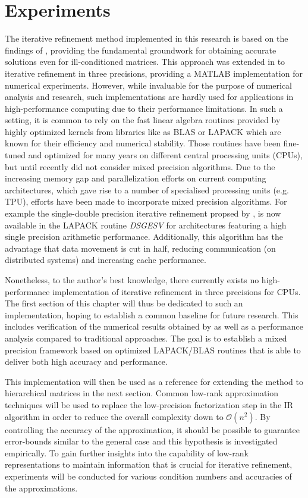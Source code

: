 \chapter{Experiments}
\label{chap:experiments}

The iterative refinement method implemented in this research is based on the findings of \cite{carson_new_2017}, providing the fundamental groundwork for obtaining accurate solutions even for ill-conditioned matrices. This approach was extended in \cite{carson_accelerating_2018} to iterative refinement in three precisions, providing a MATLAB implementation for numerical experiments. However, while invaluable for the purpose of numerical analysis and research, such implementations are hardly used for applications in high-performance computing due to their performance limitations. In such a setting, it is common to rely on the fast linear algebra routines provided by highly optimized kernels from libraries like as BLAS or LAPACK which are known for their efficiency and numerical stability. Those routines have been fine-tuned and optimized for many years on different central processing units (CPUs), but until recently did not consider mixed precision algorithms. Due to the increasing memory gap and parallelization efforts on current computing architectures, which gave rise to a number of specialised processing units (e.g. TPU), efforts have been made to incorporate mixed precision algorithms. For example the single-double precision iterative refinement propsed by \cite{langou_exploiting_2006}, is now available in the LAPACK routine \textit{DSGESV} for architectures featuring a high single precision arithmetic performance. Additionally, this algorithm has the advantage that data movement is cut in half, reducing communication (on distributed systems) and increasing cache performance. 

Nonetheless, to the author's best knowledge, there currently exists no high-performance implementation of iterative refinement in three precisions for CPUs. The first section of this chapter will thus be dedicated to such an implementation, hoping to establish a common baseline for future research. This includes verification of the numerical results obtained by \cite{carson_accelerating_2018} as well as a performance analysis compared to traditional approaches. The goal is to establish a mixed precision framework based on optimized LAPACK/BLAS routines that is able to deliver both high accuracy and performance.

This implementation will then be used as a reference for extending the method to hierarchical matrices in the next section. Common low-rank approximation techniques will be used to replace the low-precision factorization step in the IR algorithm in order to reduce the overall complexity down to $\mathcal{O}(n^2)$. By controlling the accuracy of the approximation, it should be possible to guarantee error-bounds similar to the general case and this hypothesis is investigated empirically. To gain further insights into the capability of low-rank representations to maintain information that is crucial for iterative refinement, experiments will be conducted for various condition numbers and accuracies of the approximations.

